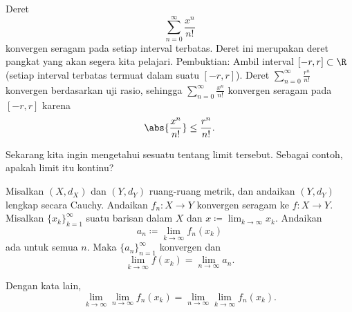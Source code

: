 \begin{example}
Deret
\begin{equation*}
\sum_{n=0}^\infty \frac{x^n}{n!} 
\end{equation*}
konvergen seragam pada setiap interval terbatas.
Deret ini merupakan deret pangkat yang akan segera kita pelajari.
Pembuktian: Ambil interval $[-r,r] \subset \R$ (setiap interval terbatas
termuat dalam suatu $[-r,r]$).
Deret $\sum_{n=0}^\infty \frac{r^n}{n!}$ konvergen berdasarkan uji rasio,
sehingga $\sum_{n=0}^\infty \frac{x^n}{n!}$ konvergen seragam pada $[-r,r]$ karena
\begin{equation*}
\abs{\frac{x^n}{n!} } \leq 
\frac{r^n}{n!} .
\end{equation*}
\end{example}

Sekarang kita ingin mengetahui sesuatu tentang limit tersebut. Sebagai contoh,
apakah limit itu kontinu?


\begin{prop} \label{prop:uniformswitch}
Misalkan $(X,d_X)$ dan $(Y,d_Y)$ ruang-ruang metrik, dan andaikan $(Y,d_Y)$
lengkap secara Cauchy.
Andaikan $f_n \colon X \to Y$ konvergen seragam ke
 $f \colon X \to Y$.
Misalkan $\{ x_k \}_{k=1}^\infty$ suatu barisan dalam $X$ dan $x \coloneqq \lim_{k \to \infty} x_k$. Andaikan
\begin{equation*}
a_n \coloneqq \lim_{k \to \infty} f_n(x_k)
\end{equation*}
ada untuk semua $n$. Maka
$\{a_n\}_{n=1}^\infty$ konvergen dan
\begin{equation*}
\lim_{k \to \infty} f(x_k) = \lim_{n\to\infty} a_n .
\end{equation*}
\end{prop}

Dengan kata lain,
\begin{equation*}
\lim_{k \to \infty} \lim_{n\to\infty} f_n(x_k) =
\lim_{n \to \infty} \lim_{k\to\infty} f_n(x_k) .
\end{equation*}


